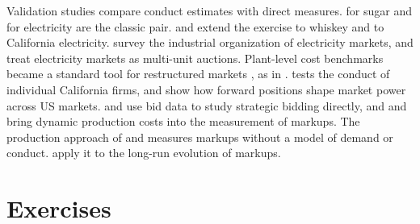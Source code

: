 Validation studies compare conduct estimates with direct measures. \citet{GenesoveMullin1998} for sugar and
\citet{Wolfram1999} for electricity are the classic pair. \citet{ClayTroesken2003} and \citet{KimKnittel2006} extend the
exercise to whiskey and to California electricity.
\citet[sec.~4]{KelloggReguant2021} survey the industrial organization of electricity markets, and
\citet[sec.~7]{HortacsuPerrigne2021} treat electricity markets as multi-unit auctions. Plant-level cost benchmarks
became a standard tool for restructured markets \citep[p.~692]{KelloggReguant2021}, as in
\citet{BorensteinBushnellWolak2002}. \citet{Puller2007}
tests the conduct of individual California firms, and \citet{BushnellMansurSaravia2008} show how forward positions
shape market power across US markets. \citet{Wolfram1998} and \citet{HortacsuPuller2008} use bid data to study
strategic bidding directly, and \citet{Mansur2008} and \citet{Reguant2014} bring dynamic production costs into the
measurement of markups. The production
approach of \citet{Hall1988} and \citet{DeLoeckerWarzynski2012} measures markups without a model of demand or conduct.
\citet{DeLoeckerEeckhoutUnger2020} apply it to the long-run evolution of markups.

\section{Exercises}\label{sec:03-exercises}

